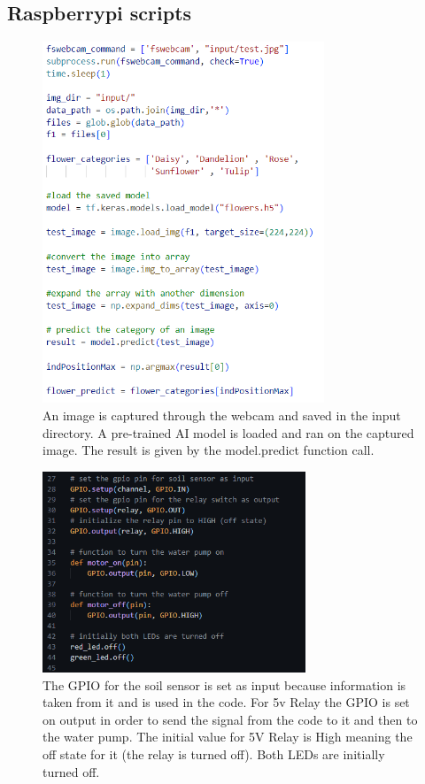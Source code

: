 \documentclass[12pt]{article}
\begin{document}
\subsection{Raspberrypi scripts}
\begin{figure}[ht]
    \centering
    \includegraphics[width=0.75\textwidth]{images/image12.png}
    \caption{An image is captured through the webcam and saved in the input directory. A pre-trained AI model is loaded and ran on the captured image. The result is given by the model.predict function call.}
    \label{fig:pic12}
\end{figure} 

\newpage

\begin{figure}[ht]
    \centering
    \includegraphics[width=0.7\textwidth]{images/image10.png}
    \caption{The GPIO for the soil sensor is set as input because information is taken from it and is used in the code. For 5v Relay the GPIO is set on output in order to send the signal from the code to it and then to the water pump.
    The initial value for 5V Relay is High meaning the off state for it (the relay is turned off). Both LEDs are initially turned off.}
    \label{fig:pic10}
\end{figure} 
    
\end{document}
